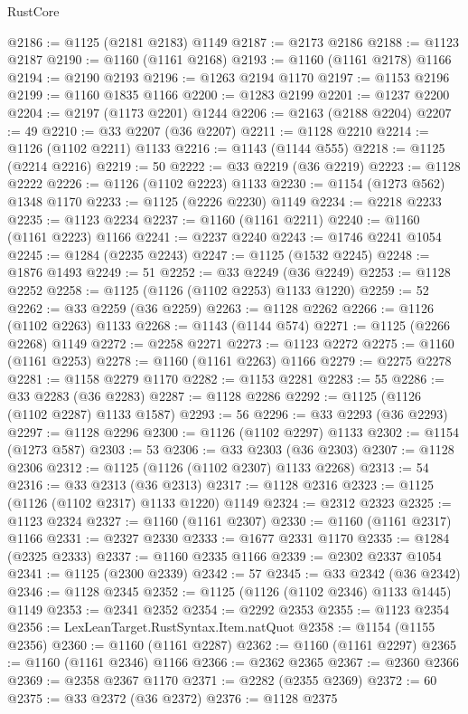 \begin{lexlean}{RustCore}
\begin{coremodule}
@2186 := @1125 (@2181 @2183) @1149
@2187 := @2173 @2186
@2188 := @1123 @2187
@2190 := @1160 (@1161 @2168)
@2193 := @1160 (@1161 @2178) @1166
@2194 := @2190 @2193
@2196 := @1263 @2194 @1170
@2197 := @1153 @2196
@2199 := @1160 @1835 @1166
@2200 := @1283 @2199
@2201 := @1237 @2200
@2204 := @2197 (@1173 @2201) @1244
@2206 := @2163 (@2188 @2204)
@2207 := 49
@2210 := @33 @2207 (@36 @2207)
@2211 := @1128 @2210
@2214 := @1126 (@1102 @2211) @1133
@2216 := @1143 (@1144 @555)
@2218 := @1125 (@2214 @2216)
@2219 := 50
@2222 := @33 @2219 (@36 @2219)
@2223 := @1128 @2222
@2226 := @1126 (@1102 @2223) @1133
@2230 := @1154 (@1273 @562) @1348 @1170
@2233 := @1125 (@2226 @2230) @1149
@2234 := @2218 @2233
@2235 := @1123 @2234
@2237 := @1160 (@1161 @2211)
@2240 := @1160 (@1161 @2223) @1166
@2241 := @2237 @2240
@2243 := @1746 @2241 @1054
@2245 := @1284 (@2235 @2243)
@2247 := @1125 (@1532 @2245)
@2248 := @1876 @1493
@2249 := 51
@2252 := @33 @2249 (@36 @2249)
@2253 := @1128 @2252
@2258 := @1125 (@1126 (@1102 @2253) @1133 @1220)
@2259 := 52
@2262 := @33 @2259 (@36 @2259)
@2263 := @1128 @2262
@2266 := @1126 (@1102 @2263) @1133
@2268 := @1143 (@1144 @574)
@2271 := @1125 (@2266 @2268) @1149
@2272 := @2258 @2271
@2273 := @1123 @2272
@2275 := @1160 (@1161 @2253)
@2278 := @1160 (@1161 @2263) @1166
@2279 := @2275 @2278
@2281 := @1158 @2279 @1170
@2282 := @1153 @2281
@2283 := 55
@2286 := @33 @2283 (@36 @2283)
@2287 := @1128 @2286
@2292 := @1125 (@1126 (@1102 @2287) @1133 @1587)
@2293 := 56
@2296 := @33 @2293 (@36 @2293)
@2297 := @1128 @2296
@2300 := @1126 (@1102 @2297) @1133
@2302 := @1154 (@1273 @587)
@2303 := 53
@2306 := @33 @2303 (@36 @2303)
@2307 := @1128 @2306
@2312 := @1125 (@1126 (@1102 @2307) @1133 @2268)
@2313 := 54
@2316 := @33 @2313 (@36 @2313)
@2317 := @1128 @2316
@2323 := @1125 (@1126 (@1102 @2317) @1133 @1220) @1149
@2324 := @2312 @2323
@2325 := @1123 @2324
@2327 := @1160 (@1161 @2307)
@2330 := @1160 (@1161 @2317) @1166
@2331 := @2327 @2330
@2333 := @1677 @2331 @1170
@2335 := @1284 (@2325 @2333)
@2337 := @1160 @2335 @1166
@2339 := @2302 @2337 @1054
@2341 := @1125 (@2300 @2339)
@2342 := 57
@2345 := @33 @2342 (@36 @2342)
@2346 := @1128 @2345
@2352 := @1125 (@1126 (@1102 @2346) @1133 @1445) @1149
@2353 := @2341 @2352
@2354 := @2292 @2353
@2355 := @1123 @2354
@2356 := LexLeanTarget.RustSyntax.Item.natQuot
@2358 := @1154 (@1155 @2356)
@2360 := @1160 (@1161 @2287)
@2362 := @1160 (@1161 @2297)
@2365 := @1160 (@1161 @2346) @1166
@2366 := @2362 @2365
@2367 := @2360 @2366
@2369 := @2358 @2367 @1170
@2371 := @2282 (@2355 @2369)
@2372 := 60
@2375 := @33 @2372 (@36 @2372)
@2376 := @1128 @2375

\end{coremodule}
\end{lexlean}
